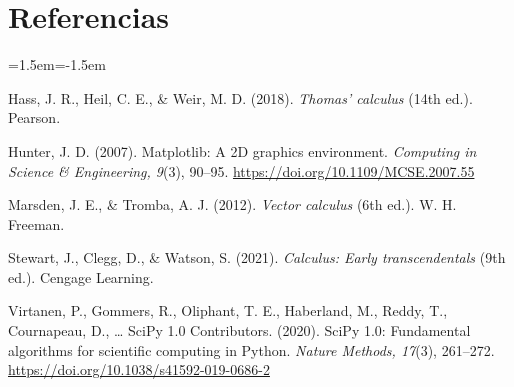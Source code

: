 \documentclass[11pt,letterpaper]{article}
\begin{document}
\section*{Referencias}
\begin{list}{}{\leftmargin=1.5em\itemindent=-1.5em\itemsep=3pt}
\item Hass, J. R., Heil, C. E., \& Weir, M. D. (2018). \textit{Thomas' calculus} (14th ed.). Pearson.
\item Hunter, J. D. (2007). Matplotlib: A 2D graphics environment. \textit{Computing in Science \& Engineering, 9}(3), 90--95. \url{https://doi.org/10.1109/MCSE.2007.55}
\item Marsden, J. E., \& Tromba, A. J. (2012). \textit{Vector calculus} (6th ed.). W. H. Freeman.
\item Stewart, J., Clegg, D., \& Watson, S. (2021). \textit{Calculus: Early transcendentals} (9th ed.). Cengage Learning.
\item Virtanen, P., Gommers, R., Oliphant, T. E., Haberland, M., Reddy, T., Cournapeau, D., \ldots{} SciPy 1.0 Contributors. (2020). SciPy 1.0: Fundamental algorithms for scientific computing in Python. \textit{Nature Methods, 17}(3), 261--272. \url{https://doi.org/10.1038/s41592-019-0686-2}
\end{list}
\end{document}
